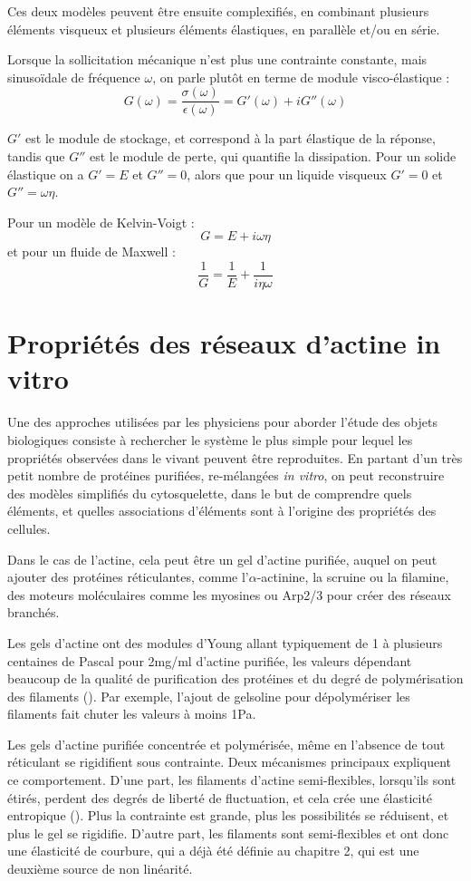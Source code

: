 Ces deux modèles peuvent être ensuite complexifiés, en combinant plusieurs éléments visqueux et plusieurs éléments élastiques, en parallèle et/ou en série. 

Lorsque la sollicitation mécanique n'est plus une contrainte constante, mais sinusoïdale de fréquence $\omega$, on parle plutôt en terme de module visco-élastique : 
$$G(\omega) = \frac{\sigma(\omega)}{\epsilon(\omega)} = G'(\omega)+iG''(\omega)$$

$G'$ est le module de stockage, et correspond à la part élastique de la réponse, tandis que $G''$ est le module de perte, qui quantifie la dissipation. Pour un solide élastique on a $G'=E$ et $G''=0$, alors que pour un liquide visqueux $G'=0$ et $G''=\omega \eta$. 

Pour un modèle de Kelvin-Voigt : 
$$ G=E+ i \omega \eta$$
et pour un fluide de Maxwell : 
$$ \frac{1}{G} = \frac{1}{E} + \frac{1}{i \eta \omega}$$


\section{Propriétés des réseaux d'actine in vitro}

Une des approches utilisées par les physiciens pour aborder l'étude des objets biologiques consiste à rechercher le système le plus simple pour lequel les propriétés observées dans le vivant peuvent être reproduites. 
En partant d'un très petit nombre de protéines purifiées, re-mélangées \textit{in vitro}, on peut reconstruire des modèles simplifiés du cytosquelette, dans le but de comprendre quels éléments, et quelles associations d'éléments sont à l'origine des propriétés des cellules. 

Dans le cas de l'actine, cela peut être un gel d'actine purifiée, auquel on peut ajouter des protéines réticulantes, comme l'$\alpha$-actinine, la scruine ou la filamine, des moteurs moléculaires comme les myosines ou Arp2/3 pour créer des réseaux branchés. 

Les gels d'actine ont des modules d'Young allant typiquement de 1 à plusieurs centaines de Pascal pour 2mg/ml d'actine purifiée, les valeurs dépendant beaucoup de la qualité de purification des protéines et du degré de polymérisation des filaments (\cite{janmey_mechanical_1994}). Par exemple, l'ajout de gelsoline pour dépolymériser les filaments fait chuter les valeurs à moins 1Pa. 

Les gels d'actine purifiée concentrée et polymérisée, même en l'absence de tout réticulant se rigidifient sous contrainte. Deux mécanismes principaux expliquent ce comportement. 
D'une part, les filaments d'actine semi-flexibles, lorsqu'ils sont étirés, perdent des degrés de liberté de fluctuation, et cela crée une élasticité entropique (\cite{storm_nonlinear_2005}). Plus la contrainte est grande, plus les possibilités se réduisent, et plus le gel se rigidifie. 
D'autre part, les filaments sont semi-flexibles et ont donc une élasticité de courbure, qui a déjà été définie au chapitre 2, qui est une deuxième source de non linéarité. 

